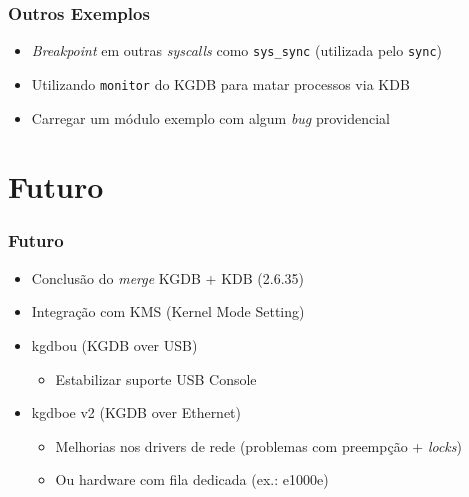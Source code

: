 \documentclass[xcolor=pdftex,dvipsnames,table]{beamer}
\begin{document}
\begin{frame}
       \frametitle{Outros Exemplos}
        \begin{center}
	\begin{itemize}
	\item \textit{Breakpoint} em outras \textit{syscalls} como {\tt sys\_sync} (utilizada pelo {\tt sync})
	\item Utilizando {\tt monitor} do KGDB para matar processos via KDB
	\item Carregar um módulo exemplo com algum \textit{bug} providencial
	\end{itemize}
        \end{center}
\end{frame}

\section{Futuro}
\begin{frame}
       \frametitle{Futuro}
        \begin{center}
        \begin{itemize}
		\item Conclusão do \textit{merge} KGDB + KDB (2.6.35)
		\item Integração com KMS (Kernel Mode Setting)
		\item kgdbou (KGDB over USB)
		\begin{itemize}
		    \item Estabilizar suporte USB Console
		\end{itemize}
		\item kgdboe v2 (KGDB over Ethernet)
		\begin{itemize}
		    \item Melhorias nos drivers de rede (problemas com preempção + \textit{locks})
		    \item Ou hardware com fila dedicada (ex.: e1000e)
		\end{itemize}
	\end{itemize}
        \end{center}
\end{frame}
\end{document}

